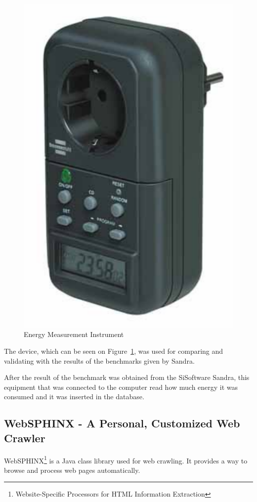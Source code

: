     \begin{figure}[!htb]
        \centering
            \includegraphics[scale=0.6]{graphics/energy_measurement_instrument}
            \caption{Energy Measurement Instrument}
            \label{fig:energy_measurement_instrument}
    \end{figure}
The device, which can be seen on Figure~\ref{fig:energy_measurement_instrument}, was used for comparing and validating with the results of the benchmarks given by Sandra.

After the result of the benchmark was obtained from the SiSoftware Sandra, this equipment that was connected to the computer read how much energy it was consumed and it was inserted in the database.
    \subsection{WebSPHINX - A Personal, Customized Web Crawler} \label{sec3:websphinx}
    WebSPHINX\footnote{Website-Specific Processors for HTML Information Extraction} is a Java class library used for web crawling. It provides a way to browse and process web pages automatically.
    
